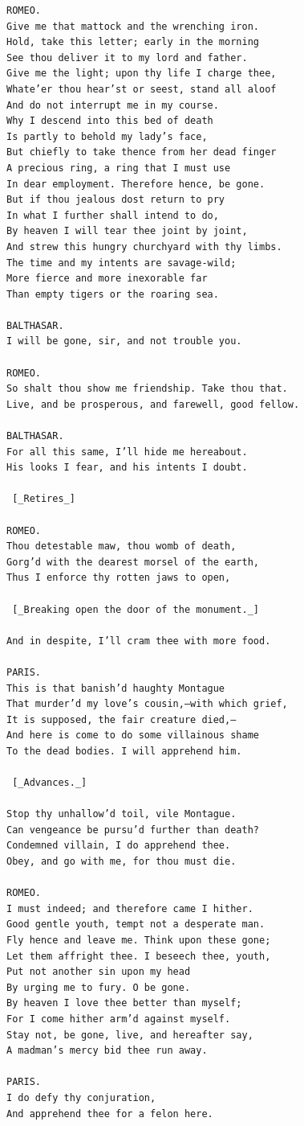 \documentclass{article}
\begin{document}
\begin{verbatim}
ROMEO.
Give me that mattock and the wrenching iron.
Hold, take this letter; early in the morning
See thou deliver it to my lord and father.
Give me the light; upon thy life I charge thee,
Whate’er thou hear’st or seest, stand all aloof
And do not interrupt me in my course.
Why I descend into this bed of death
Is partly to behold my lady’s face,
But chiefly to take thence from her dead finger
A precious ring, a ring that I must use
In dear employment. Therefore hence, be gone.
But if thou jealous dost return to pry
In what I further shall intend to do,
By heaven I will tear thee joint by joint,
And strew this hungry churchyard with thy limbs.
The time and my intents are savage-wild;
More fierce and more inexorable far
Than empty tigers or the roaring sea.

BALTHASAR.
I will be gone, sir, and not trouble you.

ROMEO.
So shalt thou show me friendship. Take thou that.
Live, and be prosperous, and farewell, good fellow.

BALTHASAR.
For all this same, I’ll hide me hereabout.
His looks I fear, and his intents I doubt.

 [_Retires_]

ROMEO.
Thou detestable maw, thou womb of death,
Gorg’d with the dearest morsel of the earth,
Thus I enforce thy rotten jaws to open,

 [_Breaking open the door of the monument._]

And in despite, I’ll cram thee with more food.

PARIS.
This is that banish’d haughty Montague
That murder’d my love’s cousin,—with which grief,
It is supposed, the fair creature died,—
And here is come to do some villainous shame
To the dead bodies. I will apprehend him.

 [_Advances._]

Stop thy unhallow’d toil, vile Montague.
Can vengeance be pursu’d further than death?
Condemned villain, I do apprehend thee.
Obey, and go with me, for thou must die.

ROMEO.
I must indeed; and therefore came I hither.
Good gentle youth, tempt not a desperate man.
Fly hence and leave me. Think upon these gone;
Let them affright thee. I beseech thee, youth,
Put not another sin upon my head
By urging me to fury. O be gone.
By heaven I love thee better than myself;
For I come hither arm’d against myself.
Stay not, be gone, live, and hereafter say,
A madman’s mercy bid thee run away.

PARIS.
I do defy thy conjuration,
And apprehend thee for a felon here.


\end{verbatim}
\end{document}
